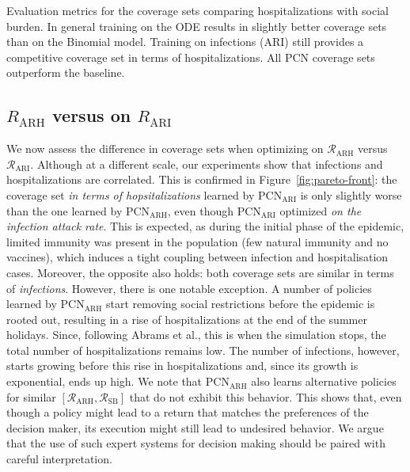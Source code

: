 \documentclass{article}
\newcommand{\mdprewardfn}{\mathcal{R}}
\begin{document}
\begin{table}[t]
  \centering
  \setlength{\tabcolsep}{0.5em} %
  {\renewcommand{\arraystretch}{1.2}%
  
  }
  \caption{Evaluation metrics for the coverage sets comparing hospitalizations with social burden. In general training on the ODE results in slightly better coverage sets than on the Binomial model. Training on infections (ARI) still provides a competitive coverage set in terms of hospitalizations. All PCN coverage sets outperform the baseline.}
  \label{tab:coverage-set}
\end{table}

\subsection{$R_\text{ARH}$ versus on $R_\text{ARI}$}
\label{sec:arh-vs-ari}

We now assess the difference in coverage sets when optimizing on $\mdprewardfn_\text{ARH}$ versus $\mdprewardfn_\text{ARI}$. Although at a different scale, our experiments show that infections and hospitalizations are correlated. This is confirmed in Figure~\ref{fig:pareto-front}: the coverage set \emph{in terms of hopsitalizations} learned by $\text{PCN}_\text{ARI}$ is only slightly worse than the one learned by $\text{PCN}_\text{ARH}$, even though $\text{PCN}_\text{ARI}$ optimized \emph{on the infection attack rate}. This is expected, as during the initial phase of the epidemic, limited immunity was present in the population (few natural immunity and no vaccines), which induces a tight coupling between infection and hospitalisation cases. Moreover, the opposite also holds: both coverage sets are similar in terms of \emph{infections}. However, there is one notable exception. A number of policies learned by $\text{PCN}_\text{ARH}$ start removing social restrictions before the epidemic is rooted out, resulting in a rise of hospitalizations at the end of the summer holidays. Since, following Abrams et al., this is when the simulation stops, the total number of hospitalizations remains low. The number of infections, however, starts growing before this rise in hospitalizations and, since its growth is exponential, ends up high. We note that $\text{PCN}_\text{ARH}$ also learns alternative policies for similar $[\mdprewardfn_\text{ARH}, \mdprewardfn_\text{SB}]$ that do not exhibit this behavior. This shows that, even though a policy might lead to a return that matches the preferences of the decision maker, its execution might still lead to undesired behavior. We argue that the use of such expert systems for decision making should be paired with careful interpretation.
\end{document}
